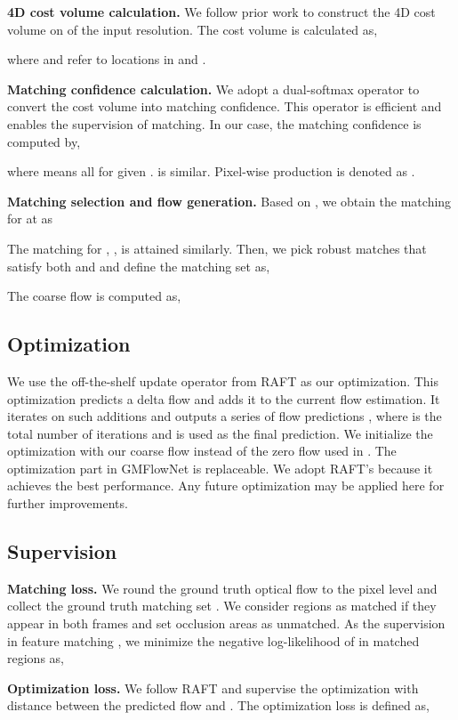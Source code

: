\documentclass[10pt,twocolumn,letterpaper]{article}
\begin{document}
{\bf 4D cost volume calculation.} We follow prior work \cite{teed2020raft,jiang2021learning} to construct the 4D cost volume on  of the input resolution. The cost volume  is calculated as,

where  and  refer to locations in  and .

{\bf Matching confidence calculation.} We adopt a dual-softmax operator \cite{Rocco18b} to convert the cost volume into matching confidence. This operator is efficient and enables the supervision of matching. In our case, the matching confidence  is computed by,

where  means all  for given .  is similar. Pixel-wise production is denoted as .

{\bf Matching selection and flow generation.} Based on , we obtain the matching for  at  as

The matching for , , is attained similarly. Then, we pick robust matches that satisfy both  and  and define the matching set  as,

The coarse flow is computed as,


\subsection{Optimization}
We use the off-the-shelf update operator from RAFT \cite{teed2020raft} as our optimization. This optimization predicts a delta flow and adds it to the current flow estimation. It iterates on such additions and outputs a series of flow predictions , where  is the total number of iterations and  is used as the final prediction. 
We initialize the optimization with our coarse flow  instead of the zero flow used in \cite{teed2020raft}. 
The optimization part in GMFlowNet is replaceable. We adopt RAFT's because it achieves the best performance. Any future optimization may be applied here for further improvements.

\subsection{Supervision}

{\bf Matching loss.} We round the ground truth optical flow  to the pixel level and collect the ground truth matching set . 
We consider regions as matched if they appear in both frames and set occlusion areas as unmatched. As the supervision in feature matching \cite{sun2021loftr}, we minimize the negative log-likelihood of  in matched regions as,


{\bf Optimization loss.} We follow RAFT \cite{teed2020raft} and supervise the optimization with  distance between the predicted flow and . The optimization loss is defined as,
\end{document}
